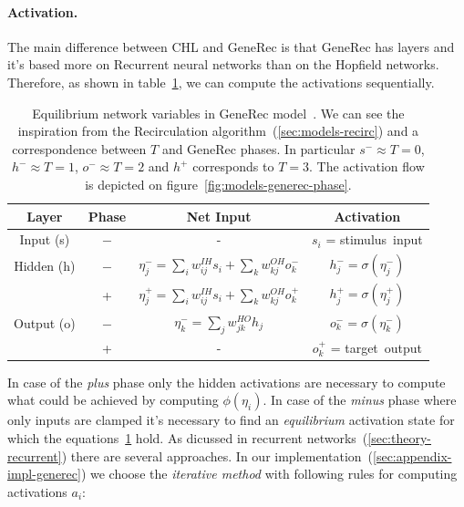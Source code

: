 \paragraph{Activation.} 
\label{sec:models-generec-activation} 
The main difference between CHL and GeneRec is that GeneRec has layers and it's based more on Recurrent neural networks than on the Hopfield networks. Therefore, as shown in table~\ref{tab:models-generec}, we can compute the activations sequentially. 
\begin{table}[H]
  \centering
  \begin{tabular}{|cccc|}
    \hline
    Layer & Phase & Net Input & Activation\\
    \hline
    Input (s)    & $-$ & - & $s_i$ = \mbox{stimulus input} \\
    \hline
    Hidden (h)   & $-$ & \hspace{0.3cm}$\eta^{-}_j = \sum_i w_{ij}^{IH}s_i + \sum_k w_{kj}^{OH}o^{-}_k$\hspace{0.3cm} &
    $h^{-}_j = \sigma(\eta^{-}_j)$\hspace{0.3cm}\\
          &  +  & $\eta^{+}_j = \sum_{i}w_{ij}^{IH}s_i + \sum_k w_{kj}^{OH}o^{+}_k$ & $h^{+}_{j} = \sigma(\eta^{+}_j)$ \\
    \hline
    Output (o) & $-$ & $\eta^{-}_k = \sum_j w_{jk}^{HO}h_j$ & $o^{-}_k = \sigma(\eta^{-}_k)$\\
           &  +  & - & $o^{+}_k$ = \mbox{target output} \\
    \hline
  \end{tabular}
  \caption{Equilibrium network variables in GeneRec model~\citet{o1996bio}. We can see the inspiration from the Recirculation algorithm~(\ref{sec:models-recirc}) and a correspondence between $T$ and GeneRec phases. In particular $s^{-} \approx T=0$, $h^{-} \approx T=1$, $o^{-} \approx T=2$ and $h^{+}$ corresponds to $T=3$. The activation flow is depicted on figure~\ref{fig:models-generec-phase}.}
  \label{tab:models-generec}
\end{table}
In case of the \emph{plus} phase only the hidden activations are necessary to compute what could be achieved by computing $\phi(\eta_i)$. In case of the \emph{minus} phase where only inputs are clamped it's necessary to find an \emph{equilibrium} activation state for which the equations~\ref{tab:models-generec} hold. As dicussed in recurrent networks~(\ref{sec:theory-recurrent}) there are several approaches. In our implementation~(\ref{sec:appendix-impl-generec}) we choose the \emph{iterative method} with following rules for computing activations $a_i$: 

